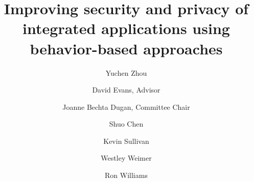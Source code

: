 \documentclass[10pt,letterpaper,openany]{book}
\author{Yuchen Zhou}
\title{Improving security and privacy of integrated applications using behavior-based approaches}
\begin{document}
\maketitle
\copyrightpage
\frontmatter

\begin{signatures}
\signature[David Evans]{David Evans, Advisor}
\signature[Joanne Bechta Dugan]{Joanne Bechta Dugan, Committee Chair}
\signature[Shuo Chen]{Shuo Chen}
\signature[Kevin Sullivan]{Kevin Sullivan}
\signature[Westley Weimer]{Westley Weimer}
\signature[Ron Williams]{Ron Williams}
\end{signatures}
\dedication{To everyone who's helped me succeed}

\tableofcontents
\listoftables
\listoffigures
\mainmatter






\backmatter
\nocite{*}

\end{document}

